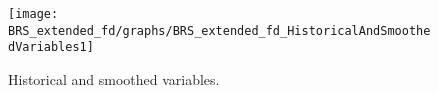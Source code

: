  
\begin{figure}[H]
\centering 
\texttt{[image: BRS\_extended\_fd/graphs/BRS\_extended\_fd\_HistoricalAndSmoothedVariables1]}
\caption{Historical and smoothed variables.}\label{Fig:HistoricalAndSmoothedVariables:1}
\end{figure}


